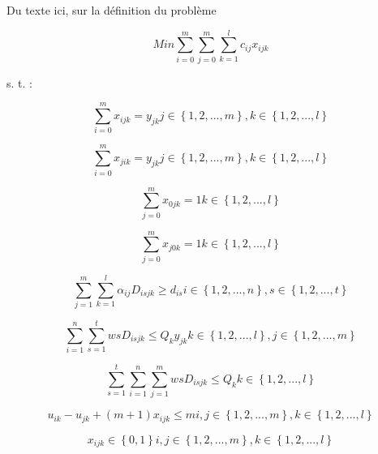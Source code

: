 \documentclass[12pt, a4paper, onecolumn, twoside,french,cleardoublepage=plain,openany]{article}
\begin{document}
Du texte ici, sur la définition du problème





\begin{equation}
Min \sum_{i=0}^{m}\sum_{j=0}^{m}\sum_{k=1}^{l}c_{ij}x_{ijk}
\end{equation}

s. t. :

\begin{equation}
\sum_{i=0}^{m}x_{ijk} = y_{jk}   j\in\left\{1,2,...,m\right\}, k\in\left\{1,2,...,l\right\}
\end{equation}

\begin{equation}
\sum_{i=0}^{m}x_{jik} = y_{jk}   j\in\left\{1,2,...,m\right\}, k\in\left\{1,2,...,l\right\}
\end{equation}

\begin{equation}
\sum_{j=0}^{m}x_{0jk} = 1   k\in\left\{1,2,...,l\right\}
\end{equation}

\begin{equation}
\sum_{j=0}^{m}x_{j0k} = 1   k\in\left\{1,2,...,l\right\}
\end{equation}

\begin{equation}
\sum_{j=1}^{m}\sum_{k=1}^{l}\alpha_{ij}D_{isjk} \geq d_{is}    i\in\left\{1,2,...,n\right\}, s\in\left\{1,2,...,t\right\}
\end{equation}

\begin{equation}
\sum_{i=1}^{n}\sum_{s=1}^{t}w{s}D_{isjk} \leq Q_{k}y_{jk}    k\in\left\{1,2,...,l\right\}, j\in\left\{1,2,...,m\right\}
\end{equation}

\begin{equation}
\sum_{s=1}^{t}\sum_{i=1}^{n}\sum_{j=1}^{m}w{s}D_{isjk} \leq Q_{k}    k\in\left\{1,2,...,l\right\}
\end{equation}

\begin{equation}
u_{ik} - u_{jk} + (m + 1)x_{ijk} \leq m   i,j\in\left\{1,2,...,m\right\}, k\in\left\{1,2,...,l\right\}
\end{equation}

\begin{equation}
x_{ijk} \in\left\{0,1\right\}   i,j\in\left\{1,2,...,m\right\}, k\in\left\{1,2,...,l\right\}
\end{equation}
\end{document}
